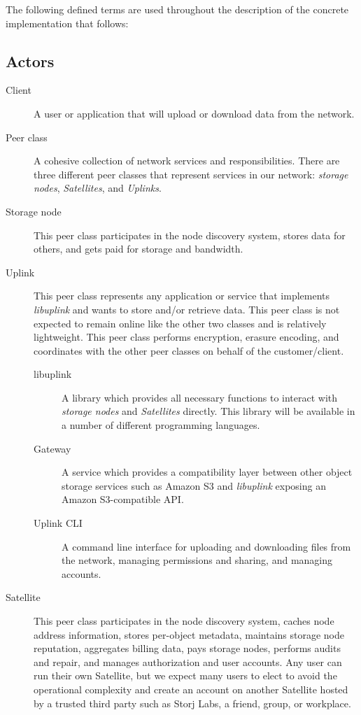 \documentclass[8pt,fleqn,openany]{book}
\begin{document}
The following defined terms are used throughout the description of the concrete
implementation that follows:

\subsection{Actors}

\begin{description}
\item[Client] A user or application that will upload or download data from the network.

\item[Peer class] A cohesive collection of network services and
  responsibilities. There are three different peer classes that represent
  services in our network: {\em storage nodes}, {\em Satellites}, and {\em Uplinks}.

\item[Storage node] This peer class participates in the node discovery
  system, stores data for others, and gets paid for storage and bandwidth.

\item[Uplink] This peer class represents any application or
  service that implements {\em libuplink} and wants to store and/or retrieve data. This peer class
  is not expected to remain online like the other two classes and is
  relatively lightweight. This peer class performs encryption, erasure encoding,
  and coordinates with the other peer classes on behalf of the customer/client.

  \begin{description}
  \item[libuplink] A library which provides all necessary functions to interact
    with {\em storage nodes} and {\em Satellites} directly. This library will
    be available in a number of different programming languages.

  \item[Gateway] A service which provides a compatibility layer between other
    object storage services such as Amazon S3 and {\em libuplink} exposing an
    Amazon S3-compatible API.

  \item[Uplink CLI] A command line interface for uploading and downloading
    files from the network, managing permissions and sharing, and managing
    accounts.
  \end{description}

\item[Satellite] This peer class participates in the node discovery system,
  caches node address information, stores per-object metadata, maintains storage
  node reputation, aggregates billing data, pays storage nodes, performs audits and repair, and manages
  authorization and user accounts.
  Any user can run their own Satellite, but we expect many users
  to elect to avoid the operational complexity and create an account on
  another Satellite hosted by a trusted third party such as Storj Labs,
  a friend, group, or workplace.

\end{description}
\end{document}
